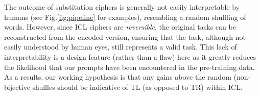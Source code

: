 \documentclass[11pt]{article}
\newcommand{\daniel}[1]{{\color{purple}[{\bf DK}: #1]}}
\begin{document}
The outcome of substitution ciphers is generally not easily interpretable by humans (see Fig.\ref{fig:pipeline} for examples), resembling a random shuffling of words. However, since ICL ciphers are \emph{reversible}, the original tasks can be reconstructed from the encoded version, ensuring that the task, although not easily understood by human eyes, still represents a valid task.
This lack of interpretability is a design feature (rather than a flaw) here as it greatly reduces the likelihood that our prompts have been encountered in the pre-training data.
As a results, our working hypothesis is that any gains above the random (non-bijective shuffles should be indicative of TL (as opposed to TR) within ICL.








\end{document}
